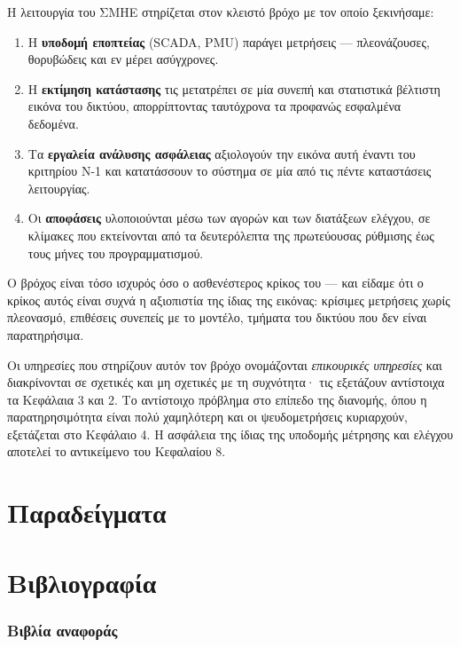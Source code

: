 Η λειτουργία του ΣΜΗΕ στηρίζεται στον κλειστό βρόχο με τον οποίο ξεκινήσαμε:

\begin{enumerate}
\item Η \textbf{υποδομή εποπτείας} (SCADA, PMU) παράγει μετρήσεις — πλεονάζουσες,
      θορυβώδεις και εν μέρει ασύγχρονες.
\item Η \textbf{εκτίμηση κατάστασης} τις μετατρέπει σε μία συνεπή και στατιστικά βέλτιστη
      εικόνα του δικτύου, απορρίπτοντας ταυτόχρονα τα προφανώς εσφαλμένα δεδομένα.
\item Τα \textbf{εργαλεία ανάλυσης ασφάλειας} αξιολογούν την εικόνα αυτή έναντι του
      κριτηρίου N-1 και κατατάσσουν το σύστημα σε μία από τις πέντε καταστάσεις λειτουργίας.
\item Οι \textbf{αποφάσεις} υλοποιούνται μέσω των αγορών και των διατάξεων ελέγχου, σε
      κλίμακες που εκτείνονται από τα δευτερόλεπτα της πρωτεύουσας ρύθμισης έως τους μήνες
      του προγραμματισμού.
\end{enumerate}

Ο βρόχος είναι τόσο ισχυρός όσο ο ασθενέστερος κρίκος του — και είδαμε ότι ο κρίκος αυτός
είναι συχνά η αξιοπιστία της ίδιας της εικόνας: κρίσιμες μετρήσεις χωρίς πλεονασμό,
επιθέσεις συνεπείς με το μοντέλο, τμήματα του δικτύου που δεν είναι παρατηρήσιμα.

Οι υπηρεσίες που στηρίζουν αυτόν τον βρόχο ονομάζονται \emph{επικουρικές υπηρεσίες} και
διακρίνονται σε σχετικές και μη σχετικές με τη συχνότητα· τις εξετάζουν αντίστοιχα τα
Κεφάλαια 3 και 2. Το αντίστοιχο πρόβλημα στο επίπεδο της διανομής, όπου η παρατηρησιμότητα
είναι πολύ χαμηλότερη και οι ψευδομετρήσεις κυριαρχούν, εξετάζεται στο Κεφάλαιο 4. Η
ασφάλεια της ίδιας της υποδομής μέτρησης και ελέγχου αποτελεί το αντικείμενο του
Κεφαλαίου 8.

\section{Παραδείγματα}
\label{kef-01-paradeigmata}

\section{Βιβλιογραφία}
\label{kef-01-vivliografia}

\subsubsection*{Βιβλία αναφοράς}

